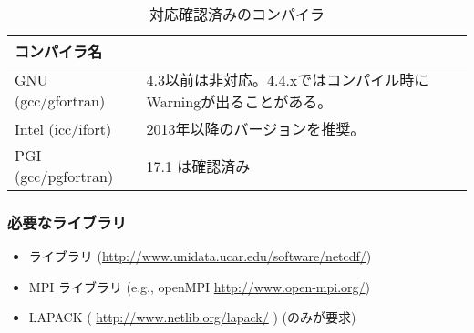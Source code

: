 

\begin{table}[htb]
\begin{center}
\caption{対応確認済みのコンパイラ}
\begin{tabularx}{150mm}{|l|X|X|} \hline
 \rowcolor[gray]{0.9} コンパイラ名 & \\ \hline
 GNU (gcc/gfortran)    & 4.3以前は非対応。4.4.xではコンパイル時にWarningが出ることがある。 \\ \hline
 Intel (icc/ifort)     & 2013年以降のバージョンを推奨。 \\ \hline
 PGI (gcc/pgfortran)   & 17.1 は確認済み              \\ \hline
\end{tabularx}
\label{tab:compatible_compiler}
\end{center}
\end{table}

\subsubsection{\bf 必要なライブラリ}\label{sec:inst_env}
  \begin{itemize}
   \item {\netcdf} ライブラリ (\url{http://www.unidata.ucar.edu/software/netcdf/})
   \item MPI ライブラリ (e.g., openMPI \url{http://www.open-mpi.org/})
   \item LAPACK ( \url{http://www.netlib.org/lapack/} ) (\scalegm のみが要求)
  \end{itemize}

